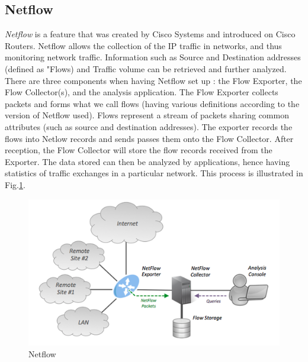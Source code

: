 \subsection{Netflow}

\textit{Netflow} is a feature that was created by Cisco Systems and introduced on Cisco Routers. Netflow allows the collection of the IP traffic in networks, and thus monitoring network traffic. Information such as Source and Destination addresses (defined as "Flows) and Traffic volume can be retrieved and further analyzed.\\

There are three components when having Netflow set up : the Flow Exporter, the Flow Collector(s), and the analysis application. The Flow Exporter collects packets and forms what we call flows (having various definitions according to the version of Netflow used). Flows represent a stream of packets sharing common attributes (such as source and destination addresses). The exporter records the flows into Netlow records and sends passes them onto the Flow Collector. After reception, the Flow Collector will store the flow records received from the Exporter. The data stored can then be analyzed by applications, hence having statistics of traffic exchanges in a particular network. This process is illustrated in Fig.\ref{fig:netflow}.\\

\begin{figure}
  \centering
  \includegraphics[width=\textwidth]{res/netflow.png}
  \caption{Netflow}
  \label{fig:netflow}
\end{figure}

